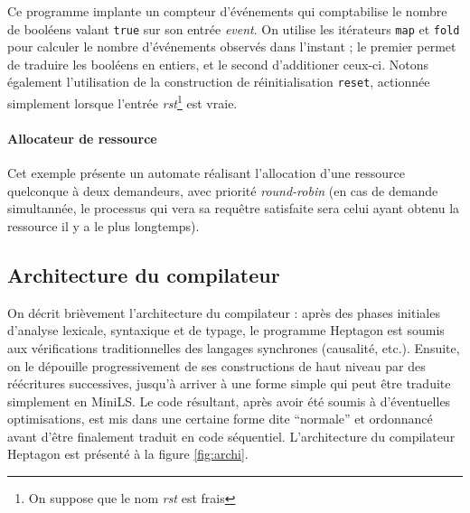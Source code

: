\documentclass[9pt,a4paper]{article}
\newcommand{\LANG}{Heptagon}
\begin{document}
\begin{center}
  
\end{center}

Ce programme implante un compteur d'événements qui comptabilise le nombre de
booléens valant \texttt{true} sur son entrée \textit{event}. On utilise les
itérateurs \texttt{map} et \texttt{fold} pour calculer le nombre d'événements
observés dans l'instant ; le premier permet de traduire les booléens en entiers,
et le second d'additioner ceux-ci. Notons également l'utilisation de la
construction de réinitialisation \texttt{reset}, actionnée simplement lorsque
l'entrée \textit{rst}\footnote{On suppose que le nom \textit{rst} est frais} est
vraie.

\paragraph{Allocateur de ressource}



Cet exemple présente un automate réalisant l'allocation d'une ressource
quelconque à deux demandeurs, avec priorité \textit{round-robin} (en cas de
demande simultannée, le processus qui vera sa requêtre satisfaite sera celui
ayant obtenu la ressource il y a le plus longtemps).

\subsection{Architecture du compilateur}

On décrit brièvement l'architecture du compilateur : après des phases initiales
d'analyse lexicale, syntaxique et de typage, le programme \LANG{} est soumis aux
vérifications traditionnelles des langages synchrones (causalité,
etc.). Ensuite, on le dépouille progressivement de ses constructions de haut
niveau par des réécritures successives, jusqu'à arriver à une forme simple qui
peut être traduite simplement en MiniLS. Le code résultant, après avoir été
soumis à d'éventuelles optimisations, est mis dans une certaine forme dite
``normale'' et ordonnancé avant d'être finalement traduit en code
séquentiel. L'architecture du compilateur \LANG{} est présenté à la figure
\ref{fig:archi}.

\end{document}
